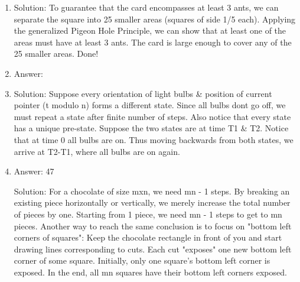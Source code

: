 \begin{enumerate}
\item
Solution: To guarantee that the card encompasses at least 3 ants, we can separate the square into 25 smaller areas (squares of side 1/5 each). Applying the generalized Pigeon Hole Principle, we can show that at least one of the areas must have at least 3 ants. The card is large enough to cover any of the 25 smaller areas. Done!




\item
Answer: 




\item
Solution: Suppose every orientation of light bulbs \& position of current pointer (t modulo n) forms a different state. Since all bulbs dont go off, we must repeat a state after finite number of steps. Also notice that every state has a unique pre-state. Suppose the two states are at time T1 \& T2. Notice that at time 0 all bulbs are on. Thus moving backwards from both states, we arrive at T2-T1, where all bulbs are on again.




\item
Answer: 47
 
Solution: For a chocolate of size mxn, we need mn - 1 steps. By breaking an existing piece horizontally or vertically, we merely increase the total number of pieces by one. Starting from 1 piece, we need mn - 1 steps to get to mn pieces.
Another way to reach the same conclusion is to focus on "bottom left corners of squares": Keep the chocolate rectangle in front of you and start drawing lines corresponding to cuts. Each cut "exposes" one new bottom left corner of some square. Initially, only one square's bottom left corner is exposed. In the end, all mn squares have their bottom left corners exposed.




\end{enumerate}
